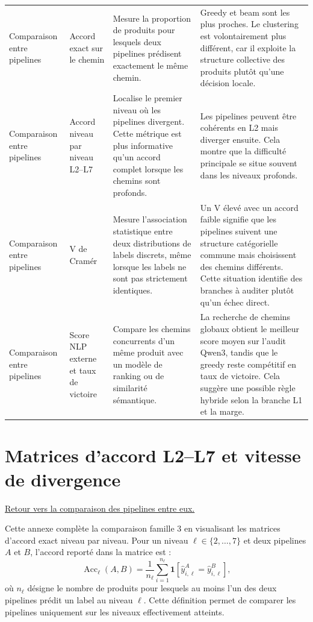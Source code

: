 \documentclass[12pt,a4paper]{report}
\begin{document}
\begin{table}[H]
{\begin{tabular}{p{3.0cm}p{3.2cm}p{5.0cm}p{5.4cm}}
        Comparaison entre pipelines & Accord exact sur le chemin & Mesure la proportion de produits pour lesquels deux pipelines prédisent exactement le même chemin. & Greedy et beam sont les plus proches. Le clustering est volontairement plus différent, car il exploite la structure collective des produits plutôt qu'une décision locale. \\
        Comparaison entre pipelines & Accord niveau par niveau L2--L7 & Localise le premier niveau où les pipelines divergent. Cette métrique est plus informative qu'un accord complet lorsque les chemins sont profonds. & Les pipelines peuvent être cohérents en L2 mais diverger ensuite. Cela montre que la difficulté principale se situe souvent dans les niveaux profonds. \\
        Comparaison entre pipelines & V de Cramér & Mesure l'association statistique entre deux distributions de labels discrets, même lorsque les labels ne sont pas strictement identiques. & Un V élevé avec un accord faible signifie que les pipelines suivent une structure catégorielle commune mais choisissent des chemins différents. Cette situation identifie des branches à auditer plutôt qu'un échec direct. \\
        Comparaison entre pipelines & Score NLP externe et taux de victoire & Compare les chemins concurrents d'un même produit avec un modèle de ranking ou de similarité sémantique. & La recherche de chemins globaux obtient le meilleur score moyen sur l'audit Qwen3, tandis que le greedy reste compétitif en taux de victoire. Cela suggère une possible règle hybride selon la branche L1 et la marge. \\
        \bottomrule
    \end{tabular}
    }
\end{table}

\section*{Matrices d'accord L2--L7 et vitesse de divergence}
\label{sec:l2-l7-family3-matrices-annex}

\noindent\hyperref[sec:l2-l7-pipeline-agreement]{Retour vers la comparaison des pipelines entre eux.}

Cette annexe complète la comparaison famille 3 en visualisant les matrices d'accord exact niveau par niveau. Pour un niveau $\ell \in \{2,\ldots,7\}$ et deux pipelines $A$ et $B$, l'accord reporté dans la matrice est :
\begin{equation}
    \operatorname{Acc}_{\ell}(A,B)
    =
    \frac{1}{n_{\ell}}
    \sum_{i=1}^{n_{\ell}}
    \mathbf{1}\left[
    \hat{y}^{A}_{i,\ell}
    =
    \hat{y}^{B}_{i,\ell}
    \right],
\end{equation}
où $n_{\ell}$ désigne le nombre de produits pour lesquels au moins l'un des deux pipelines prédit un label au niveau $\ell$. Cette définition permet de comparer les pipelines uniquement sur les niveaux effectivement atteints.
\end{document}
